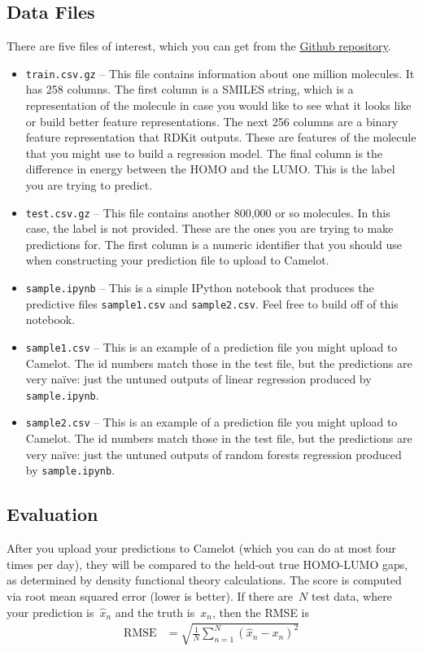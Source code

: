 \documentclass[12pt]{article}
\begin{document}
	\subsection*{Data Files}
	There are five files of interest, which you can get from the \href{https://github.com/harvard-ml-courses/cs181-s18-practicals/tree/master/P1}{Github repository}. 
	\begin{itemize}
		\item \verb|train.csv.gz| -- This file contains information about one million molecules.  It has 258 columns.  The first column is a SMILES string, which is a representation of the molecule in case you would like to see what it looks like or build better feature representations. The next 256 columns are a binary feature representation that RDKit outputs.  These are features of the molecule that you might use to build a regression model.  The final column is the difference in energy between the HOMO and the LUMO.  This is the label you are trying to predict.
		\item \verb|test.csv.gz| -- This file contains another 800,000 or so molecules.  In this case, the label is not provided.  These are the ones you are trying to make predictions for. The first column is a numeric identifier that you should use when constructing your prediction file to upload to Camelot.
		\item \verb|sample.ipynb| -- This is a simple IPython notebook that produces the predictive files \verb|sample1.csv| and \verb|sample2.csv|.  Feel free to build off of this notebook.
		\item \verb|sample1.csv| -- This is an example of a prediction file you might upload to Camelot.  The id numbers match those in the test file, but the predictions are very na\"ive: just the untuned outputs of linear regression produced by \verb|sample.ipynb|.
		\item \verb|sample2.csv| -- This is an example of a prediction file you might upload to Camelot.  The id numbers match those in the test file, but the predictions are very na\"ive: just the untuned outputs of random forests regression produced by \verb|sample.ipynb|.
	\end{itemize}
	
	\subsection*{Evaluation}
	After you upload your predictions to Camelot (which you can do at most four times per day), they will be compared to the held-out true HOMO-LUMO gaps, as determined by density functional theory calculations.  The score is computed via root mean squared error (lower is better).  If there are~$N$ test data, where your prediction is~$\hat{x}_n$ and the truth is~$x_n$, then the RMSE is 
	\begin{align*}
		\text{RMSE} &= \sqrt{\frac{1}{N}\sum_{n=1}^N (\hat{x}_n-x_n)^2}
	\end{align*}
	
\end{document}
